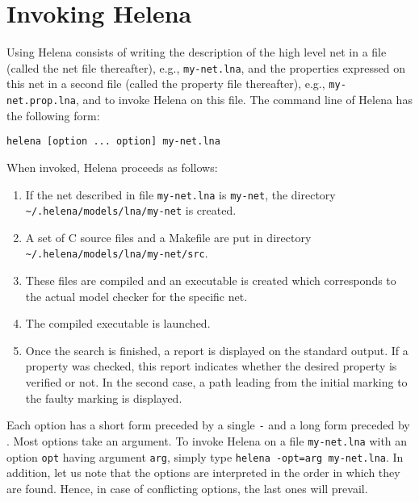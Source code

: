 \newcommand\optionDef[2]{\shortForm{#1}, \longForm{#2}}
\section{Invoking Helena}
\label{section_invoking_helena}
Using Helena consists of writing the description of the high level net
in a file (called the net file thereafter), e.g., \texttt{my-net.lna},
and the properties expressed on this net in a second file (called the
property file thereafter), e.g., \texttt{my-net.prop.lna}, and to
invoke Helena on this file.  The command line of Helena has the
following form:
\begin{center}
\begin{verbatim}
helena [option ... option] my-net.lna
\end{verbatim}
\end{center}

When invoked, Helena proceeds as follows:
\begin{enumerate}
\item If the net described in file \texttt{my-net.lna} is
  \texttt{my-net}, the directory \texttt{\~{}/.helena/models/lna/my-net}
  is created.
\item A set of C source files and a Makefile are put in directory
  \texttt{\~{}/.helena/models/lna/my-net/src}.
\item These files are compiled and an executable is created which
  corresponds to the actual model checker for the specific net.
\item The compiled executable is launched.
\item Once the search is finished, a report is displayed on the
  standard output.  If a property was checked, this report indicates
  whether the desired property is verified or not.  In the second
  case, a path leading from the initial marking to the faulty marking
  is displayed.
\end{enumerate}

Each option has a short form preceded by a single \texttt{-} and a
long form preceded by \longForm{}.  Most options take an argument.  To
invoke Helena on a file \texttt{my-net.lna} with an option
\texttt{opt} having argument \texttt{arg}, simply type \texttt{helena
  -opt=arg my-net.lna}.  In addition, let us note that the options are
interpreted in the order in which they are found.  Hence, in case of
conflicting options, the last ones will prevail.

